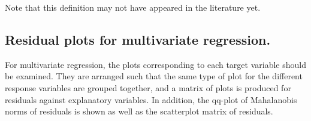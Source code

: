 \documentclass{article}
\begin{document}
Note that this definition may not have appeared in the literature yet.

\subsection{Residual plots for multivariate regression.}
For multivariate regression, the plots corresponding to each target
variable should be examined. 
They are arranged such that the same type of plot for the different
response variables are grouped together, and a matrix of plots is produced
for residuals against explanatory variables.
In addition, the qq-plot of Mahalanobis norms of residuals is shown as well
as the scatterplot matrix of residuals.
\end{document}
